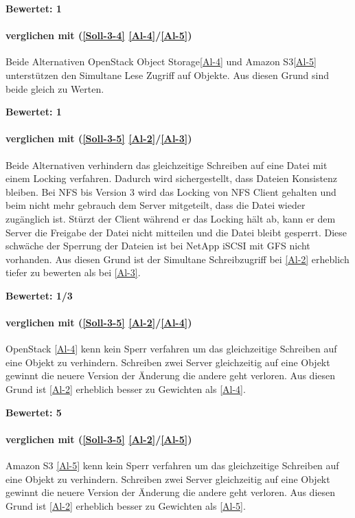 \textbf{Bewertet: 1}


\paragraph*{  verglichen mit  (\ref{Soll-3-4} \ref{Al-4}/\ref{Al-5})}
Beide Alternativen OpenStack Object Storage\ref{Al-4} und Amazon S3\ref{Al-5} unterstützen den Simultane Lese Zugriff auf Objekte. Aus diesen Grund sind beide gleich zu Werten.


\textbf{Bewertet: 1}


\paragraph*{  verglichen mit  (\ref{Soll-3-5} \ref{Al-2}/\ref{Al-3})}
Beide Alternativen verhindern das gleichzeitige Schreiben auf eine Datei mit einem Locking verfahren. Dadurch wird sichergestellt, dass Dateien Konsistenz bleiben. Bei NFS bis Version 3 wird das Locking von NFS Client gehalten und beim nicht mehr gebrauch dem Server mitgeteilt, dass die Datei wieder zugänglich ist. Stürzt der Client während er das Locking hält ab, kann er dem Server die Freigabe der Datei nicht mitteilen und die Datei bleibt gesperrt. 
Diese schwäche der Sperrung der Dateien ist bei NetApp iSCSI mit GFS nicht vorhanden. Aus diesen Grund ist der Simultane Schreibzugriff bei  \ref{Al-2} erheblich tiefer zu bewerten als bei   \ref{Al-3}.

\textbf{Bewertet: 1/3}

\paragraph*{  verglichen mit  (\ref{Soll-3-5} \ref{Al-2}/\ref{Al-4})}
OpenStack \ref{Al-4} kenn kein Sperr verfahren um das gleichzeitige Schreiben auf eine Objekt zu verhindern. Schreiben zwei Server gleichzeitig auf eine Objekt gewinnt die neuere Version der Änderung die andere geht verloren. Aus diesen Grund ist  \ref{Al-2} erheblich besser zu Gewichten als  \ref{Al-4}.

\textbf{Bewertet: 5}

\paragraph*{  verglichen mit  (\ref{Soll-3-5} \ref{Al-2}/\ref{Al-5})}
Amazon S3 \ref{Al-5} kenn kein Sperr verfahren um das gleichzeitige Schreiben auf eine Objekt zu verhindern. Schreiben zwei Server gleichzeitig auf eine Objekt gewinnt die neuere Version der Änderung die andere geht verloren. Aus diesen Grund ist  \ref{Al-2} erheblich besser zu Gewichten als  \ref{Al-5}.


